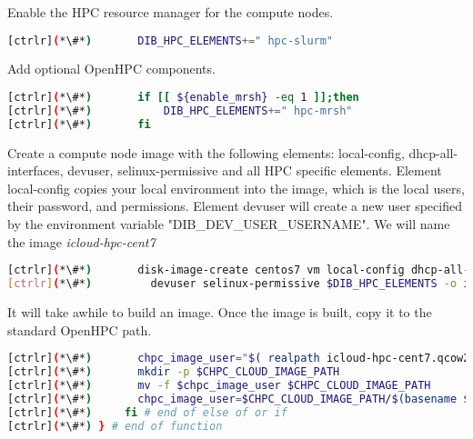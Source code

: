 	Enable the HPC resource manager for the compute nodes.


\begin{lstlisting}[language=bash,keywords={}]
[ctrlr](*\#*)       DIB_HPC_ELEMENTS+=" hpc-slurm"
\end{lstlisting} 

	Add optional OpenHPC components.


\begin{lstlisting}[language=bash,keywords={}]
[ctrlr](*\#*)       if [[ ${enable_mrsh} -eq 1 ]];then
[ctrlr](*\#*)           DIB_HPC_ELEMENTS+=" hpc-mrsh"
[ctrlr](*\#*)       fi
\end{lstlisting} 

	Create a compute node image with the following elements: local-config, dhcp-all-interfaces, devuser, selinux-permissive and all HPC specific elements. Element local-config copies your local environment into the image, which is the local users, their password, and permissions. Element devuser will create a new user specified by the environment variable "DIB\_DEV\_USER\_USERNAME". We will name the image {\em  icloud-hpc-cent7 }


\begin{lstlisting}[language=bash,keywords={}]
[ctrlr](*\#*)       disk-image-create centos7 vm local-config dhcp-all-interfaces \
[ctrlr](*\#*)         devuser selinux-permissive $DIB_HPC_ELEMENTS -o icloud-hpc-cent7
\end{lstlisting} 


	It will take awhile to build an image. Once the image is built, copy it to the standard OpenHPC path.


\begin{lstlisting}[language=bash,keywords={}]
[ctrlr](*\#*)       chpc_image_user="$( realpath icloud-hpc-cent7.qcow2)"
[ctrlr](*\#*)       mkdir -p $CHPC_CLOUD_IMAGE_PATH
[ctrlr](*\#*)       mv -f $chpc_image_user $CHPC_CLOUD_IMAGE_PATH
[ctrlr](*\#*)       chpc_image_user=$CHPC_CLOUD_IMAGE_PATH/$(basename $chpc_image_user)
[ctrlr](*\#*)     fi # end of else of or if
[ctrlr](*\#*) } # end of function
\end{lstlisting} 

